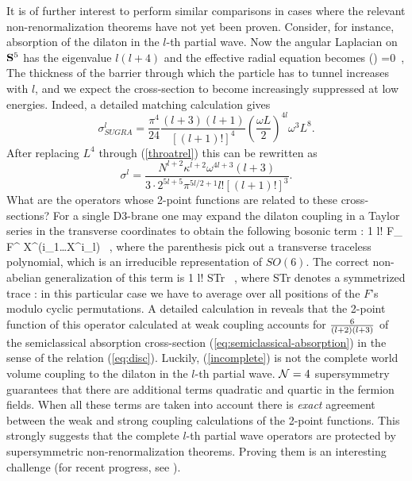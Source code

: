 \documentclass[12pt]{article}
\begin{document}
It is of further interest to perform similar comparisons in cases
where the relevant non-renormalization theorems have not yet been
proven. Consider, for instance, absorption of the dilaton in the
$l$-th partial wave. Now the angular Laplacian on ${\bf S}^5$ has the
eigenvalue $l(l+4)$ and the effective radial equation becomes
\be
\label{partialthree}
 \psi(\rho) =0\ ,
\ee
The thickness of the barrier through which the particle has to
tunnel increases with $l$, and we expect the cross-section
to become increasingly suppressed at low energies.
Indeed, a detailed matching calculation \cite{gukt,KTV} gives  
\begin{equation}
\sigma^l_{SUGRA} = \frac{\pi^4}{ 24}  \frac{(l + 3) (l + 1)}{ [(l + 1)!]^4}
\left( \frac{\omega L}{ 2} \right)^{4l} \omega^3 L^8.
\end{equation}
After 
replacing $L^4$ through (\ref{throatrel}) this can be rewritten as
\begin{equation}
\sigma^l = \frac{N^{l + 2} \kappa^{l + 2} \omega^{4l + 3} (l + 3)}{
3 \cdot 2^{5l + 5} \pi^{5l/2 + 1}l![(l + 1)!]^3}.
\label{eq:semiclassical-absorption}
\end{equation}
What are the operators whose 2-point functions are related to these
cross-sections? For a single D3-brane one may expand the
dilaton coupling in a Taylor series in the transverse coordinates to
obtain the following bosonic term \cite{kleb}:
\be
{1 l!} F_{\alpha\beta} F^{\alpha\beta} X^{(i_1}\ldots X^{i_l)}
\ ,
\ee
where the parenthesis pick out a transverse traceless polynomial,
which is an irreducible representation of $SO(6)$.
The correct non-abelian generalization of this term is
\cite{KTV}
\be \label{incomplete}
{1 l!} {\rm STr} 
\ ,
\ee
where STr denotes a symmetrized trace \cite{Tseytlin}: 
in this particular case we have to average
over all positions of the $F$'s modulo cyclic permutations.
A detailed calculation in \cite{KTV} reveals that the 2-point function
of this operator calculated at weak coupling
accounts for ${6\over (l+2)(l+3)} $ 
of the semiclassical absorption cross-section
(\ref{eq:semiclassical-absorption}) in the sense of the relation
(\ref{eq:disc}). Luckily, (\ref{incomplete}) is not the complete
world volume coupling to the dilaton in the $l$-th partial wave.
${\cal N}=4$ supersymmetry guarantees that there are additional terms
quadratic and quartic in the fermion fields. When all these terms are
taken into account there is {\it exact} agreement between the weak
and strong coupling calculations of the 2-point functions.
This strongly suggests that the complete $l$-th
partial wave operators are protected by supersymmetric
non-renormalization theorems. Proving them is an interesting challenge
(for recent progress, see \cite{Sken}).
\end{document}
